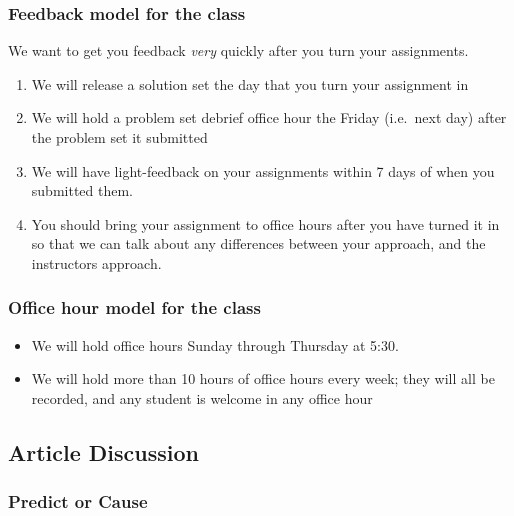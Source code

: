 \documentclass[
]{article}
\providecommand{\tightlist}{%
  \setlength{\itemsep}{0pt}\setlength{\parskip}{0pt}}
\begin{document}
\hypertarget{feedback-model-for-the-class}{%
\subsubsection{Feedback model for the class}\label{feedback-model-for-the-class}}

We want to get you feedback \emph{very} quickly after you turn your assignments.

\begin{enumerate}
\def\labelenumi{\arabic{enumi}.}
\tightlist
\item
  We will release a solution set the day that you turn your assignment in
\item
  We will hold a problem set debrief office hour the Friday (i.e.~next day) after the problem set it submitted
\item
  We will have light-feedback on your assignments within 7 days of when you submitted them.
\item
  You should bring your assignment to office hours after you have turned it in so that we can talk about any differences between your approach, and the instructors approach.
\end{enumerate}

\hypertarget{office-hour-model-for-the-class}{%
\subsubsection{Office hour model for the class}\label{office-hour-model-for-the-class}}

\begin{itemize}
\tightlist
\item
  We will hold office hours Sunday through Thursday at 5:30.
\item
  We will hold more than 10 hours of office hours every week; they will all be recorded, and any student is welcome in any office hour
\end{itemize}

\hypertarget{article-discussion}{%
\subsection{Article Discussion}\label{article-discussion}}

\hypertarget{predict-or-cause}{%
\subsubsection{Predict or Cause}\label{predict-or-cause}}
\end{document}
